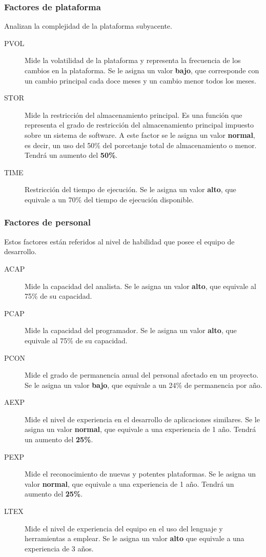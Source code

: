 \documentclass[11pt,a4paper,spanish,twoside]{book}
\begin{document}
\subsubsection{Factores de plataforma}
Analizan la complejidad de la plataforma subyacente.
\begin{description}
\item[PVOL] Mide la volatilidad de la plataforma y representa la frecuencia de
  los cambios en la plataforma. Se le asigna un valor \textbf{bajo}, que
  corresponde con un cambio principal cada doce meses y un cambio menor todos
  los meses.

\item[STOR] Mide la restricción del almacenamiento principal. Es una función
  que representa el grado de restricción del almacenamiento principal
  impuesto sobre un sistema de software. A este factor se le asigna un valor
  \textbf{normal}, es decir, un uso del 50\% del porcetanje total de
  almacenamiento o menor. Tendrá un aumento del \textbf{50\%}.

\item[TIME] Restricción del tiempo de ejecución. Se le asigna un valor
  \textbf{alto}, que equivale a un 70\% del tiempo de ejecución disponible.
\end{description}

\subsubsection{Factores de personal}
Estos factores están referidos al nivel de habilidad que posee el equipo de
desarrollo.
\begin{description}
\item[ACAP] Mide la capacidad del analista. Se le asigna un valor
\textbf{alto}, que equivale al 75\% de su capacidad.
\item[PCAP] Mide la capacidad del programador. Se le asigna un valor
\textbf{alto}, que equivale al 75\% de su capacidad.
\item[PCON] Mide el grado de permanencia anual del personal afectado en un
proyecto. Se le asigna un valor \textbf{bajo}, que equivale a un 24\% de
permanencia por año.
\item[AEXP] Mide el nivel de experiencia en el desarrollo de aplicaciones
similares. Se le asigna un valor \textbf{normal}, que equivale a una
experiencia de 1 año. Tendrá un aumento del \textbf{25\%}.
\item[PEXP] Mide el reconocimiento de nuevas y potentes plataformas. Se le
asigna un valor \textbf{normal}, que equivale a una experiencia de 1
año. Tendrá un aumento del \textbf{25\%}. 
\item[LTEX] Mide el nivel de experiencia del equipo en el uso del lenguaje y
herramientas a emplear. Se le asigna un valor \textbf{alto} que equivale a una
experiencia de 3 años.
\end{description}
\end{document}
